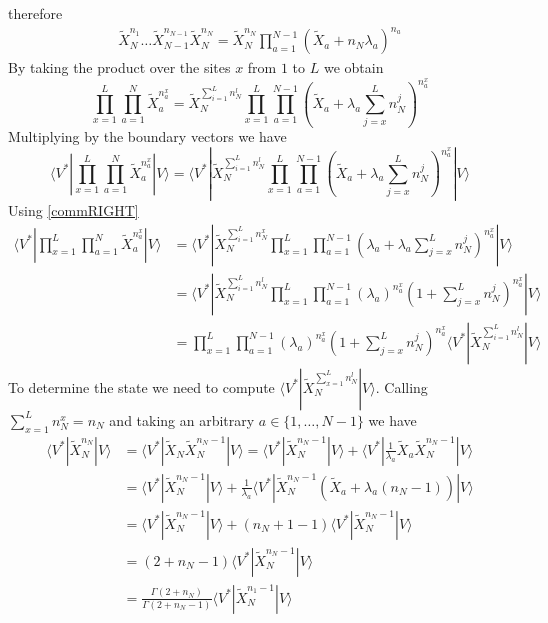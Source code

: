 \documentclass[10pt]{article}
\numberwithin{equation}{section}
\numberwithin{equation}{subsection}
\begin{document}
therefore 
\begin{align*}
	\widetilde{X}_{N}^{n_{1}}\ldots\widetilde{X}_{N-1}^{n_{N-1}}\widetilde{X}_{N}^{n_{N}}=\widetilde{X}_{N}^{n_{N}}\prod_{a=1}^{N-1}\left(\widetilde{X}_{a}+n_{N}\lambda_{a}\right)^{n_{a}}
\end{align*}
By taking the product over the sites $x$ from $1$ to $L$ we obtain 
\begin{equation}
	\prod_{x=1}^{L}\prod_{a=1}^{N}\widetilde{X}_{a}^{n_{a}^{x}}=\widetilde{X}_{N}^{\sum_{i=1}^{L}n_{N}^{l}}\prod_{x=1}^{L}\prod_{a=1}^{N-1}\left(\widetilde{X}_{a}+\lambda_{a}\sum_{j=x}^{L}n_{N}^{j}\right)^{n_{a}^{x}}
\end{equation}
Multiplying by the boundary vectors we have 
\begin{equation}
	\langle V^{*}|\prod_{x=1}^{L}\prod_{a=1}^{N}\widetilde{X}_{a}^{n_{a}^{x}}
	|V \rangle=\langle V^{*}|\widetilde{X}_{N}^{\sum_{i=1}^{L}n_{N}^{l}}\prod_{x=1}^{L}\prod_{a=1}^{N-1}\left(\widetilde{X}_{a}+\lambda_{a}\sum_{j=x}^{L}n_{N}^{j}\right)^{n_{a}^{x}}|V\rangle
\end{equation}
Using \eqref{commRIGHT}
\begin{align*}
	\langle V^{*}|\prod_{x=1}^{L}\prod_{a=1}^{N}\widetilde{X}_{a}^{n_{a}^{x}}
	|V \rangle&=\langle V^{*}|\widetilde{X}_{N}^{\sum_{i=1}^{L}n_{N}^{x}}\prod_{x=1}^{L}\prod_{a=1}^{N-1}\left(\lambda_{a}+\lambda_{a}\sum_{j=x}^{L}n_{N}^{j}\right)^{n_{a}^{x}}|V\rangle
	\\&=
	\langle V^{*}|\widetilde{X}_{N}^{\sum_{i=1}^{L}n_{N}^{l}}\prod_{x=1}^{L}\prod_{a=1}^{N-1}\left(\lambda_{a}\right)^{n_{a}^{x}}\left(1+\sum_{j=x}^{L}n_{N}^{j}\right)^{n_{a}^{x}}|V\rangle
	\\&=
	\prod_{x=1}^{L}\prod_{a=1}^{N-1}\left(\lambda_{a}\right)^{n_{a}^{x}}\left(1+\sum_{j=x}^{L}n_{N}^{j}\right)^{n_{a}^{x}}\langle V^{*}|\widetilde{X}_{N}^{\sum_{i=1}^{L}n_{N}^{l}}|V\rangle
\end{align*}
To determine the state we need to compute $\langle V^{*}|\widetilde{X}_{N}^{\sum_{x=1}^{L}n_{N}^{l}}|V\rangle$. Calling $\sum_{x=1}^{L}n_{N}^{x}=n_{N}$ and taking an arbitrary $a\in \{1,\ldots,N-1\}$ we have
\begin{align*}
	\langle V^{*}|\widetilde{X}_{N}^{n_{N}}|V\rangle&=\langle V^{*}|\widetilde{X}_{N}\widetilde{X}_{N}^{n_{N}-1}|V\rangle=\langle V^{*}|\widetilde{X}_{N}^{n_{N}-1}|V\rangle +\langle V^{*}|\frac{1}{\lambda_{a}}\widetilde{X}_{a}\widetilde{X}_{N}^{n_{N}-1}|V\rangle
	\\&=
	\langle V^{*}|\widetilde{X}_{N}^{n_{N}-1}|V\rangle+\frac{1}{\lambda_{a}}\langle V^{*}|\widetilde{X}_{N}^{n_{N}-1}\left(\widetilde{X}_{a}+\lambda_{a}(n_{N}-1)\right)|V\rangle
	\\&=
	\langle V^{*}|\widetilde{X}_{N}^{n_{N}-1}|V\rangle+\left(n_{N}+1-1\right)\langle V^{*}|\widetilde{X}_{N}^{n_{N}-1}|V\rangle
	\\&=
	\left(2+n_{N}-1\right)\langle V^{*}|\widetilde{X}_{N}^{n_{N}-1}|V\rangle
	\\&=
	\frac{\Gamma(2+n_{N})}{\Gamma(2+n_{N}-1)}\langle V^{*}|\widetilde{X}_{N}^{n_{1}-1}|V\rangle
\end{align*}
\end{document}
